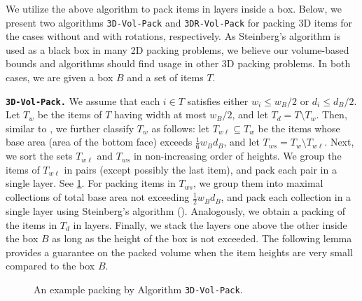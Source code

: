 \documentclass[10pt,a4paper]{amsart}
\theoremstyle{definition}
\begin{document}
We utilize the above algorithm to pack items in layers inside a box. Below, we present two algorithms \texttt{3D-Vol-Pack} and \texttt{3DR-Vol-Pack} for packing 3D items for the cases without and with rotations, respectively. As Steinberg's algorithm is used as a black box in many 2D packing problems, we believe our volume-based bounds and algorithms should find usage in other 3D packing problems. In both cases, we are given a box $B$ and a set of items $T$.

\noindent \textbf{\texttt{3D-Vol-Pack.}} We assume that each $i\in T$ satisfies either $w_i \le w_B/2$ or $d_i \le d_B/2$. 
Let $T_w$ be the items of $T$ having width at most $w_B/2$, and let $T_d = T\setminus T_w$. Then, similar to \cite{3d-knapsack}, we further classify $T_w$ as follows: let $T_{w\ell}\subseteq T_w$ be the items whose base area (area of the bottom face) exceeds $\frac{1}{6}w_Bd_B$, and let $T_{ws} = T_w \setminus T_{w\ell}$. Next, we sort the sets $T_{w\ell}$ and $T_{ws}$ in non-increasing order of heights. We group the items of $T_{w\ell}$ in pairs (except possibly the last item), and pack each pair in a single layer. See \cref{fig:3d-vol-pack}. For packing items in $T_{ws}$, we group them into maximal collections of total base area not exceeding $\frac{1}{2}w_Bd_B$, and pack each collection in a single layer using Steinberg's algorithm (). Analogously, we obtain a packing of the items in $T_d$ in layers. Finally, we stack the layers one above the other inside the box $B$ as long as the height of the box is not exceeded. The following lemma provides a guarantee on the packed volume 
when the item heights are very small compared to the box $B$. 

\begin{figure}
    \centering
    
    \caption{An example packing by Algorithm \texttt{3D-Vol-Pack}.}
    \label{fig:3d-vol-pack}
\end{figure}

\end{document}

